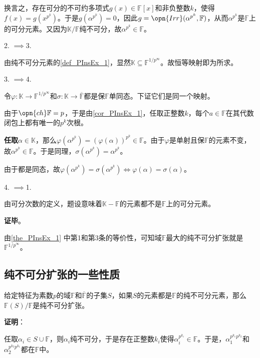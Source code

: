 换言之，存在可分的不可约多项式$g(x)\in\mathbb{F}[x]$和非负整数$k$，使得$f(x)=g(x^{p^k})$。于是$g(\alpha^{p^k})=0$，因此$g=\opn{Irr}(\alpha^{p^k}, \mathbb{F})$，从而$\alpha^{p^k}$是$\mathbb{F}$上的可分元素。又因为$\mathbb{K}/\mathbb{F}$纯不可分，故$\alpha^{p^k}\in\mathbb{F}$。


2. $\implies$3. 

由纯不可分元素的\autoref{def_PInsEx_1}，显然$\mathbb{K}\subseteq\mathbb{F}^{1/p^\infty}$。故恒等映射即为所求。

3. $\implies$4. 

令$\varphi:\mathbb{K}\to\mathbb{F}^{1/p^\infty}$和$\sigma:\mathbb{K}\to\overline{\mathbb{F}}$都是保$\mathbb{F}$单同态。下证它们是同一个映射。

由于$\opn{ch}\mathbb{F}=p$，于是由\autoref{cor_PInsEx_1}，任取正整数$k$，每个$a\in\mathbb{F}$在其代数闭包上都有唯一的$p^k$次根。

\textbf{任取}$\alpha\in\mathbb{K}$，那么$\varphi(\alpha^{p^k})=(\varphi(\alpha))^{p^k}\in\mathbb{F}$。由于$\varphi$是单射且保$\mathbb{F}$的元素不变，故$\alpha^{p^k}\in\mathbb{F}$。于是同理，$\sigma(\alpha^{p^k})=\alpha^{p^k}$。

由于都是同态，故$\varphi(\alpha^{p^k})=\sigma(\alpha^{p^k})\iff \varphi(\alpha)=\sigma(\alpha)$。

4. $\implies$1. 

由可分次数的定义，题设意味着$\mathbb{K}-\mathbb{F}$的元素都不是$\mathbb{F}$上的可分元素。


\textbf{证毕}。

由\autoref{the_PInsEx_1} 中第1和第3条的等价性，可知域$\mathbb{F}$最大的纯不可分扩张就是$\mathbb{F}^{1/p^\infty}$。





\subsection{纯不可分扩张的一些性质}


\begin{theorem}{}
给定特征为素数$p$的域$\mathbb{F}$和$\overline{\mathbb{F}}$的子集$S$，如果$S$的元素都是$\mathbb{F}$的纯不可分元素，那么$\mathbb{F}(S)/\mathbb{F}$是纯不可分扩张。
\end{theorem}

\textbf{证明}：

任取$\alpha_i\in S\cup\mathbb{F}$，则$\alpha_i$纯不可分，于是存在正整数$k_i$使得$\alpha_i^{p^{k_i}}\in\mathbb{F}$。于是，$\alpha_1^{p^{k_1}p^{k_2}}$和$\alpha_2^{p^{k_2}p^{k_1}}$都在$\mathbb{F}$中。

